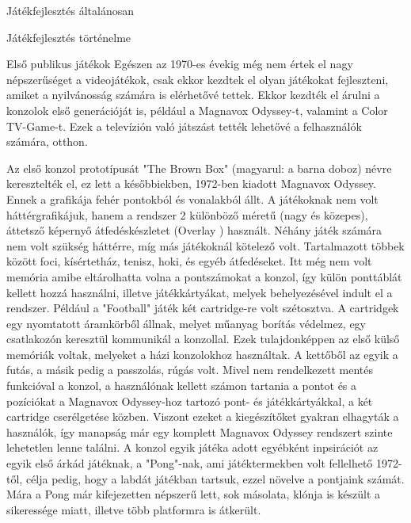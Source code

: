 \begin{MyChapter}{Játékfejlesztés általánosan}
\begin{MySection}{Játékfejlesztés történelme}
		\begin{MySubSection}{Első publikus játékok}
			Egészen az 1970-es évekig még nem értek el nagy népszerűséget a videojátékok, csak ekkor kezdtek el olyan játékokat fejleszteni, amiket a nyilvánosság számára is elérhetővé tettek. Ekkor kezdték el árulni a konzolok első generációját is, például a Magnavox Odyssey-t, valamint a Color TV-Game-t. Ezek a televízión való játszást tették lehetővé a felhasználók számára, otthon.
			
			Az első konzol prototípusát "The Brown Box" (magyarul: a barna doboz) névre keresztelték el, ez lett a későbbiekben, 1972-ben kiadott Magnavox Odyssey. Ennek a grafikája fehér pontokból és vonalakból állt. A játékoknak nem volt háttérgrafikájuk, hanem a rendszer 2 különböző méretű (nagy és közepes), áttetsző képernyő átfedéskészletet (Overlay%
			) használt. Néhány játék számára nem volt szükség háttérre, míg más játékoknál kötelező volt. Tartalmazott többek között foci, kísértetház, tenisz, hoki, és egyéb átfedéseket. Itt még nem volt memória amibe eltárolhatta volna a pontszámokat a konzol, így külön ponttáblát kellett hozzá használni, illetve játékkártyákat, melyek behelyezésével indult el a rendszer. Például a "Football" játék két cartridge-re volt szétosztva. A cartridgek egy nyomtatott áramkörből állnak, melyet műanyag borítás védelmez, egy csatlakozón keresztül kommunikál a konzollal. Ezek tulajdonképpen az első külső memóriák voltak, melyeket a házi konzolokhoz használtak. A kettőből az egyik a futás, a másik pedig a passzolás, rúgás volt. Mivel nem rendelkezett mentés funkcióval a konzol, a használónak kellett számon tartania a pontot és a pozíciókat a Magnavox Odyssey-hoz tartozó pont- és játékkártyákkal, a két cartridge cserélgetése közben. Viszont ezeket a kiegészítőket gyakran elhagyták a használók, így manapság már egy komplett Magnavox Odyssey rendszert szinte lehetetlen lenne találni.
			\cite{magnavox-odyssey_01}
			\cite{magnavox-odyssey_02}
			A konzol egyik játéka adott egyébként inpsirációt az egyik első árkád játéknak, a "Pong"-nak, ami játéktermekben volt fellelhető 1972-től, célja pedig, hogy a labdát játékban tartsuk, ezzel növelve a pontjaink számát. Mára a Pong már kifejezetten népszerű lett, sok másolata, klónja is készült a sikeressége miatt, illetve több platformra is átkerült.
			\cite{pong}
			

\end{MySubSection}
\end{MySection}
\end{MyChapter}

